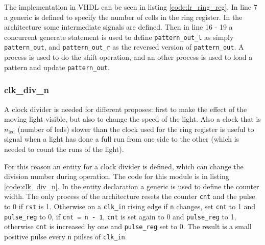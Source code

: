 \documentclass[12pt]{article}   	%
\begin{document}
The implementation  in VHDL can be seen in listing \ref{code:lr_ring_reg}. In line 7 a generic is defined to specify the number of cells in the ring register. In the architecture some intermediate signals are defined. Then in line 16 - 19 a concurrent generate statement is used to define \lstinline|pattern_out_l| as simply \lstinline|pattern_out|, and \lstinline|pattern_out_r| as the reversed version of \lstinline|pattern_out|. A process is used to do the shift operation, and an other process is used to load a pattern and update \lstinline|pattern_out|.

\subsubsection{clk\_div\_n}
A clock divider is needed for different proposes: first to make the effect of the moving light visible, but also to change the speed of the light. Also a clock that is $n_\text{led}$ (number of leds) slower than the clock used for the ring register is useful to signal when a light has done a full run from one side to the other (which is needed to count the runs of the light).

For this reason an entity for a clock divider is defined, which can change the division number during operation. The code for this module is in listing \ref{code:clk_div_n}. In the entity declaration a generic is used to define the counter width. The only process of the architecture resets the counter \lstinline|cnt| and the pulse to 0 if \lstinline|rst| is 1. Otherwise on a \lstinline|clk_in| rising edge if \lstinline|n| changes, set \lstinline|cnt| to 1 and \lstinline|pulse_reg| to 0, if \lstinline|cnt = n - 1|, \lstinline|cnt| is set again to 0 and \lstinline|pulse_reg| to 1, otherwise \lstinline|cnt| is increased by one and \lstinline|pulse_reg| set to 0. The result is a small positive pulse every \lstinline|n| pulses of \lstinline|clk_in|.
\end{document}
